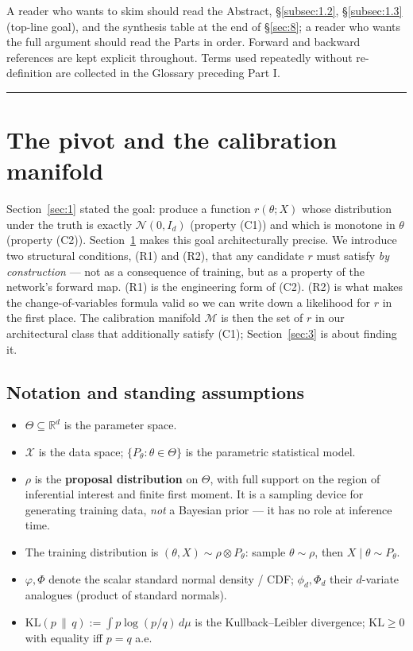 \documentclass[11pt]{article}
\providecommand{\tightlist}{\setlength{\itemsep}{0pt}\setlength{\parskip}{0pt}}
\begin{document}
A reader who wants to skim should read the Abstract, \S\ref{subsec:1.2},
\S\ref{subsec:1.3} (top-line goal), and the synthesis table at the end
of \S\ref{sec:8}; a reader who wants the full argument should read the
Parts in order. Forward and backward references are kept explicit
throughout. Terms used repeatedly without re-definition are collected
in the Glossary preceding Part I.

\medskip\hrule\medskip

\section{The pivot and the calibration manifold}\label{sec:2}

Section~\ref{sec:1} stated the goal: produce a function
\(r(\theta; X)\) whose distribution under the truth is exactly
\(\mathcal{N}(0, I_d)\) (property (C1)) and which is monotone in
\(\theta\) (property (C2)). Section~\ref{sec:2} makes this goal
architecturally precise. We introduce two structural conditions, (R1)
and (R2), that any candidate \(r\) must satisfy \emph{by construction}
--- not as a consequence of training, but as a property of the network's
forward map. (R1) is the engineering form of (C2). (R2) is what makes
the change-of-variables formula valid so we can write down a likelihood
for \(r\) in the first place. The calibration manifold
\(\mathcal{M}\) is then the set of \(r\) in our architectural class
that additionally satisfy (C1); Section~\ref{sec:3} is about finding it.

\subsection{Notation and standing assumptions}\label{subsec:2.1}

\begin{itemize}
\tightlist
\item
  \(\Theta \subseteq \mathbb{R}^d\) is the parameter space.
\item
  \(\mathcal{X}\) is the data space;
  \(\{P_\theta : \theta \in \Theta\}\) is the parametric statistical
  model.
\item
  \(\rho\) is the \textbf{proposal distribution} on \(\Theta\), with
  full support on the region of inferential interest and finite first
  moment. It is a sampling device for generating training data,
  \emph{not} a Bayesian prior --- it has no role at inference time.
\item
  The training distribution is
  \((\theta, X) \sim \rho \otimes P_\theta\): sample
  \(\theta \sim \rho\), then \(X \mid \theta \sim P_\theta\).
\item
  \(\varphi, \Phi\) denote the scalar standard normal density / CDF;
  \(\phi_d, \Phi_d\) their \(d\)-variate analogues (product of standard
  normals).
\item
  \(\mathrm{KL}(p \,\|\, q) := \int p \log(p/q)\,d\mu\) is the
  Kullback--Leibler divergence; \(\mathrm{KL} \ge 0\) with equality iff
  \(p = q\) a.e.
\end{itemize}
\end{document}

